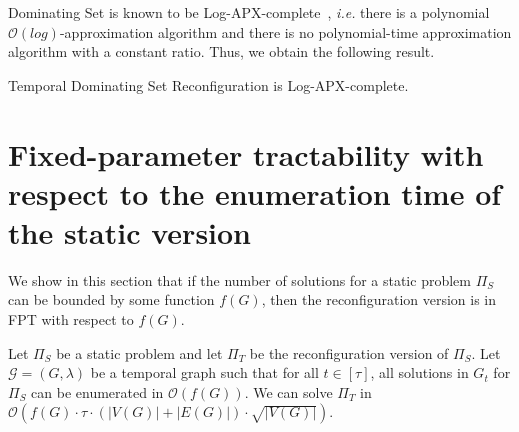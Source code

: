 {\sc Dominating Set} is known to be Log-APX-complete~\cite{EscoffierP06}, \textit{i.e.} there is a polynomial $\mathcal{O}(log)$-approximation algorithm and there is no polynomial-time approximation algorithm with a constant ratio. Thus, we obtain the following result.

\begin{corollary}
{\sc Temporal Dominating Set Reconfiguration} is Log-APX-complete.
\end{corollary}



\section{Fixed-parameter tractability with respect to the enumeration time of the static version}
\label{sec:enum}

We show in this section that if the number of solutions for a static problem $\Pi_S$ can be bounded by some function $f(G)$, then the reconfiguration version is in FPT with respect to $f(G)$.

\begin{lemmarep}
  \label{lemma:enumeration}
  Let $\Pi_S$ be a static problem and let $\Pi_T$ be the reconfiguration version of $\Pi_S$. Let $\mathcal{G}=(G,\lambda)$ be a temporal graph such that for all $t \in [\tau]$, all solutions in $G_t$ for $\Pi_S$ can be enumerated in $\mathcal{O}(f(G))$. We can solve $\Pi_T$ in $\mathcal{O}(f(G) \cdot \tau \cdot (|V(G)|+|E(G)|)\cdot\sqrt{|V(G)|})$.
\end{lemmarep}


